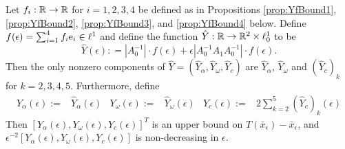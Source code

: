 \begin{theorem} \label{prop:Ydef}
	Let  $ f_i: \mathbb{R} \to \mathbb{R}$ for $i=1,2,3,4$ be defined as in Propositions \ref{prop:YfBound1}, \ref{prop:YfBound2},  \ref{prop:YfBound3}, and  \ref{prop:YfBound4} below. 
Define $f(\epsilon)= \sum_{i=1}^4 f_i \mathrm{e}_i \in \ell^1$ and 
define the function $\hat{Y}: \mathbb{R} \to \mathbb{R}^2 \times \ell^1_0$ 
to be 
\begin{equation}
		\hat{Y}(\epsilon) : =  \left| A_0^{-1}  \right| \cdot  f(\epsilon)    + \epsilon \left| A_0^{-1} A_1  A_0^{-1}   \right|    \cdot  f(\epsilon)   .
\end{equation}	
Then the only nonzero components of   $\hat{Y}=(\hat{Y}_\alpha,\hat{Y}_\omega,\hat{Y}_c)$ are $\hat{Y}_\alpha$, $\hat{Y}_\omega$ and $(\hat{Y}_c)_k$ for $k=2,3,4,5$.
Furthermore, define 
\begin{align}
	Y_\alpha(\epsilon) :=& \hat{Y}_\alpha(\epsilon) &
	Y_\omega(\epsilon) :=& \hat{Y}_\omega(\epsilon) &	
	Y_c(\epsilon) :=& 2 \sum_{k=2}^5 (\hat{Y}_c)_k(\epsilon) 
\end{align}
	Then $[Y_\alpha(\epsilon),Y_\omega(\epsilon),Y_c(\epsilon) ]^T$ is an upper bound on $ T(\bar{x}_\epsilon ) - \bar{x}_\epsilon$, and $ \epsilon^{-2} [Y_\alpha(\epsilon),Y_\omega(\epsilon),Y_c(\epsilon) ]$ is non-decreasing in $\epsilon$.  
\end{theorem}
